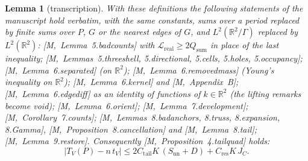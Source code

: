 \documentclass[11pt,reqno]{amsart}
\numberwithin{equation}{section}
\theoremstyle{plain}
\newtheorem{lemma}[theorem]{Lemma}
\theoremstyle{definition}
\newcommand{\R}{\mathbb{R}}
\newcommand{\nn}{\mathrm{nn}}
\newcommand{\Cc}[1]{C_{\mathrm{#1}}}
\newcommand{\cL}{\mathcal{L}}
\newcommand{\ms}[1]{\textup{[M,~#1]}}
\begin{document}
\begin{lemma}[transcription]\label{lem:transcription}
With these definitions the following statements of the manuscript hold verbatim, with the same constants, sums over a period replaced by finite sums over $P$, $G$ or the nearest edges of $G$, and $L^2(\R^2/\Gamma)$ replaced by $L^2(\R^2)$:
\ms{Lemma~5.badcounts} with $\cL_{\mathrm{real}}\ge2Q_{\mathrm{sum}}$ in place of the last inequality; \ms{Lemmas~5.threeshell, 5.directional, 5.cells, 5.holes, 5.occupancy}; \ms{Lemma~6.separated} (on $\R^2$); \ms{Lemma~6.removedmass} (Young's inequality on $\R^2$); \ms{Lemma~6.kernel} and \ms{Appendix~B}; \ms{Lemma~6.edgediff} as an identity of functions of $k\in\R^2$ (the lifting remarks become void); \ms{Lemma~6.orient}; \ms{Lemma~7.development}; \ms{Corollary~7.counts}; \ms{Lemmas~8.badanchors, 8.truss, 8.expansion, 8.Gamma}, \ms{Proposition~8.cancellation} and \ms{Lemma~8.tail}; \ms{Lemma~9.restore}.  Consequently \ms{Proposition~4.tailquad} holds:
\begin{equation}\label{eq:tailquad}
\big|T_V(P)-n\,t_V\big|\le2\Cc{tail}K\,(S_\nn+D)+\Cc{res}K\,J_C .
\end{equation}
\end{lemma}
\end{document}
